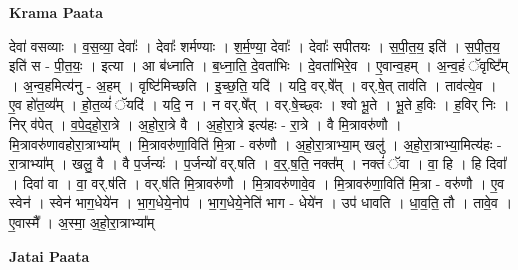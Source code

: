 \documentclass[17pt]{extarticle}
\begin{document}
\textbf{Krama Paata} \newline

देवा॑ वसव्याः । व॒स॒व्या॒ देवाः᳚ । देवाः᳚ शर्मण्याः । श॒र्म॒ण्या॒ देवाः᳚ । देवाः᳚ सपीतयः । स॒पी॒त॒य॒ इति॑ । स॒पी॒त॒य॒ इति॑ स - पी॒त॒यः॒ । इत्या । आ ब॑ध्नाति । ब॒ध्ना॒ति॒ दे॒वता॑भिः । दे॒वता॑भिरे॒व । ए॒वान्व॒हम् । अ॒न्व॒हं ॅवृष्टि᳚म् । अ॒न्व॒हमित्य॑नु - अ॒हम् । वृष्टि॑मिच्छति । इ॒च्छ॒ति॒ यदि॑ । यदि॒ वर्.षे᳚त् । वर्.षे॒त् ताव॑ति । ताव॑त्ये॒व । ए॒व हो॑त॒व्य᳚म् । हो॒त॒व्यं॑ ॅयदि॑ । यदि॒ न । न वर्.षे᳚त् । वर्.षे॒च्छ्वः । श्वो भू॒ते । भू॒ते ह॒विः । ह॒विर् निः । निर् व॑पेत् । व॒पे॒द॒हो॒रा॒त्रे । अ॒हो॒रा॒त्रे वै । अ॒हो॒रा॒त्रे इत्य॑हः - रा॒त्रे । वै मि॒त्रावरु॑णौ । मि॒त्रावरु॑णावहोरा॒त्राभ्या᳚म् । मि॒त्रावरु॑णा॒विति॑ मि॒त्रा - वरु॑णौ । अ॒हो॒रा॒त्राभ्या॒म् खलु॑ । अ॒हो॒रा॒त्राभ्या॒मित्य॑हः - रा॒त्राभ्या᳚म् । खलु॒ वै । वै प॒र्जन्यः॑ । प॒र्जन्यो॑ वर्.षति । व॒र्॒.ष॒ति॒ नक्त᳚म् । नक्तं॑ ॅवा । वा॒ हि । हि दिवा᳚ । दिवा॑ वा । वा॒ वर्.ष॑ति । वर्.ष॑ति मि॒त्रावरु॑णौ । मि॒त्रावरु॑णावे॒व । मि॒त्रावरु॑णा॒विति॑ मि॒त्रा - वरु॑णौ । ए॒व स्वेन॑ । स्वेन॑ भाग॒धेये॑न । भा॒ग॒धेये॒नोप॑ । भा॒ग॒धेये॒नेति॑ भाग - धेये॑न । उप॑ धावति । धा॒व॒ति॒ तौ । तावे॒व । ए॒वास्मै᳚ । 
अ॒स्मा॒ अ॒हो॒रा॒त्राभ्या᳚म् \newline

\textbf{Jatai Paata} \newline
\end{document}
